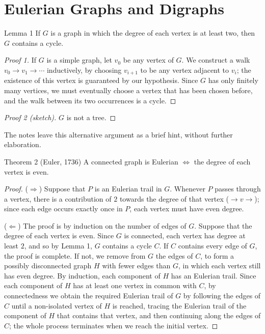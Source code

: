 \section{Eulerian Graphs and Digraphs}

\begin{thmbox}{Lemma 1}
If $G$ is a graph in which the degree of each vertex is at least two, then $G$ contains a cycle.
\end{thmbox}

\begin{proof}[Proof 1]
If $G$ is a simple graph, let $v_0$ be any vertex of $G$. We construct a walk $v_0 \to v_1 \to \cdots$ inductively, by choosing $v_{i+1}$ to be any vertex adjacent to $v_i$; the existence of this vertex is guaranteed by our hypothesis. Since $G$ has only finitely many vertices, we must eventually choose a vertex that has been chosen before, and the walk between its two occurrences is a cycle.
\end{proof}

\begin{proof}[Proof 2 (sketch)]
$G$ is not a tree.
\end{proof}

\begin{remark}
The notes leave this alternative argument as a brief hint, without further elaboration.
\end{remark}

\begin{thmbox}{{Theorem 2 (Euler, 1736)}}
A connected graph is Eulerian $\iff$ the degree of each vertex is even.
\end{thmbox}

\begin{proof}
($\Rightarrow$) Suppose that $P$ is an Eulerian trail in $G$. Whenever $P$ passes through a vertex, there is a contribution of $2$ towards the degree of that vertex ($\to v \to$); since each edge occurs exactly once in $P$, each vertex must have even degree.

\medskip
\noindent ($\Leftarrow$) The proof is by induction on the number of edges of $G$. Suppose that the degree of each vertex is even. Since $G$ is connected, each vertex has degree at least $2$, and so by Lemma 1, $G$ contains a cycle $C$. If $C$ contains every edge of $G$, the proof is complete. If not, we remove from $G$ the edges of $C$, to form a possibly disconnected graph $H$ with fewer edges than $G$, in which each vertex still has even degree. By induction, each component of $H$ has an Eulerian trail. Since each component of $H$ has at least one vertex in common with $C$, by connectedness we obtain the required Eulerian trail of $G$ by following the edges of $C$ until a non-isolated vertex of $H$ is reached, tracing the Eulerian trail of the component of $H$ that contains that vertex, and then continuing along the edges of $C$; the whole process terminates when we reach the initial vertex.
\end{proof}


